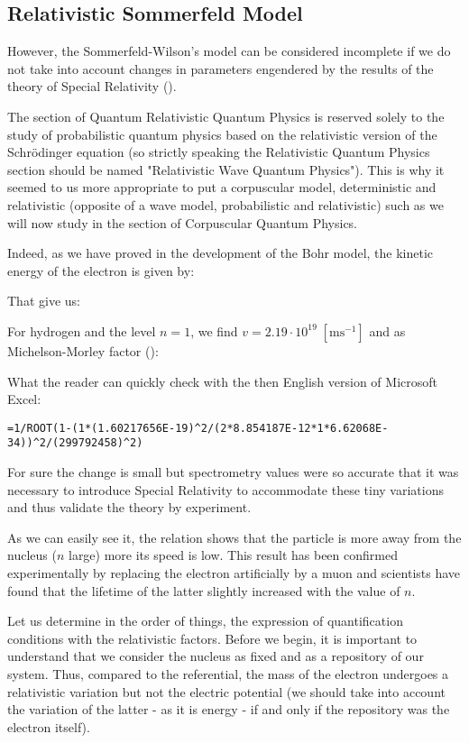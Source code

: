 	\subsection{Relativistic Sommerfeld Model}\label{relativistic sommerfeld model}
	However, the Sommerfeld-Wilson's model can be considered incomplete if we do not take into account changes in parameters engendered by the results of the theory of Special Relativity ().
	
	\begin{tcolorbox}[title=Remark,colframe=black,arc=10pt]
	The section of Quantum Relativistic Quantum Physics is reserved solely to the study of probabilistic quantum physics based on the relativistic version of the Schrödinger equation (so strictly speaking the Relativistic Quantum Physics section should be named "Relativistic Wave Quantum Physics"). This is why it seemed to us more appropriate to put a corpuscular model, deterministic and relativistic (opposite of a wave model, probabilistic and relativistic) such as we will now study in the section of Corpuscular Quantum Physics.
	\end{tcolorbox}
	Indeed, as we have proved in the development of the Bohr model, the kinetic energy of the electron is given by:
	
	That give us:
	
	For hydrogen and the level $n=1$, we find $v=2.19\cdot 10^{19}\; [\text{m}\text{s}^{-1}]$ and as Michelson-Morley factor ():
	
	What the reader can quickly check with the then English version of Microsoft Excel:
	
	\texttt{=1/ROOT(1-(1*(1.60217656E-19)\string^2/(2*8.854187E-12*1*6.62068E-34))\string^2/(299792458)\string^2)}
	
	For sure the change is small but spectrometry values were so accurate that it was necessary to introduce Special Relativity to accommodate these tiny variations and thus validate the theory by experiment.
	\begin{tcolorbox}[title=Remark,colframe=black,arc=10pt]
	As we can easily see it, the relation shows that the particle is more away from the nucleus ($n$ large) more its speed is low. This result has been confirmed experimentally by replacing the electron artificially by a muon and scientists have found that the lifetime of the latter slightly increased with the value of $n$.
	\end{tcolorbox}
	Let us determine in the order of things, the expression of quantification conditions with the relativistic factors. Before we begin, it is important to understand that we consider the nucleus as fixed and as a repository of our system. Thus, compared to the referential, the mass of the electron undergoes a relativistic variation but not the electric potential (we should take into account the variation of the latter - as it is energy - if and only if the repository was the electron itself).
	
